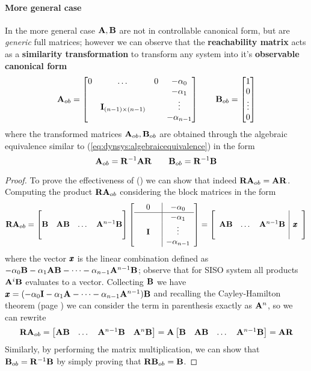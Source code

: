	\paragraph{More general case} In the more general case $\mathbf{A},\mathbf{B}$ are not in controllable canonical form, but are \textit{generic} full matrices; however we can observe that the \textbf{reachability matrix} acts as a \textbf{similarity transformation} to transform any system into it's \textbf{observable canonical form} 
	\[ \mathbf{A}_{ob} = \begin{bmatrix}  0 & \dots & 0 & - \alpha_0  \\ &&& -\alpha_1 \\ &  \mathbf{I}_{(n-1)\times(n-1)} && \vdots \\ &&& -\alpha_{n-1} \end{bmatrix} \qquad \mathbf{B}_{ob} = \begin{bmatrix} 1\\ 0 \\ \vdots \\ 0 \end{bmatrix} \]
	where the transformed matrices $\mathbf{A}_{ob}, \mathbf{B}_{ob}$ are obtained through the algebraic equivalence similar to (\ref{eq:dynsys:algebraicequivalence}) in the form
	\begin{equation} \label{eq:gram:temp3}
		\mathbf{A}_{ob} = \mathbf{R}^{-1} \mathbf{A} \mathbf{R} \qquad \mathbf{B}_{ob} = \mathbf{R}^{-1} \mathbf{B}
	\end{equation}
	\begin{proof}
		To prove the effectiveness of (\theequation) we can show that indeed $\mathbf{R} \mathbf{A}_{ob} = \mathbf{A} \mathbf{R}$. Computing the product $\mathbf{R} \mathbf{A}_{ob}$ considering the block matrices in the form
		\[ \mathbf{R} \mathbf{A}_{ob} = \begin{bmatrix}  \\ \mathbf{B}  & \mathbf{A} \mathbf{B} & \dots & \mathbf{A}^{n-1} \mathbf{B} \\ & \end{bmatrix} \begin{bmatrix} \begin{array}{ccc | c}
			& 0 & &- \alpha_0 \\ \hline
			&&& - \alpha_1 \\ 
			& \mathbf{I} &&\vdots \\ &&&-\alpha_{n-1}
		\end{array} \end{bmatrix} = \begin{bmatrix} \begin{array}{ccc | c}
			&&&\\
			\mathbf{A} \mathbf{B}&  \dots & \mathbf{A}^{n-1} \mathbf{B} & \pmb{x} \\ &&&
		\end{array} \end{bmatrix}\]
		where the vector $\pmb{x}$ is the linear combination defined as $-\alpha_0\mathbf{B} - \alpha_1 \mathbf{A}\mathbf{B} - \dots-\alpha_{n-1} \mathbf{A}^{n-1}\mathbf{B}$; observe that for SISO system all products $\mathbf{A}^i\mathbf{B}$ evaluates to a vector. Collecting $\mathbf{B}$ we have $\pmb{x} = (-\alpha_0 \mathbf{I} - \alpha_1 \mathbf{A}- \dots - \alpha_{n-1} \mathbf{A}^{n-1})\mathbf{B}$ and recalling the Cayley-Hamilton theorem (page \pageref{th:cayley}) we can consider the term in parenthesis exactly as $\mathbf{A}^n$, so we can rewrite
		\[ \mathbf{R} \mathbf{A}_{ob} = \begin{bmatrix} \mathbf{A}\mathbf{B} & \dots & \mathbf{A}^{n-1}\mathbf{B} & \mathbf{A}^n \mathbf{B} \end{bmatrix} = \mathbf{A} \begin{bmatrix} \mathbf{B} & \mathbf{A}\mathbf{B} & \dots & \mathbf{A}^{n-1} \mathbf{B} \end{bmatrix} = \mathbf{A} \mathbf{R} \]
		Similarly, by performing the matrix multiplication, we can show that $\mathbf{B}_{ob} =\mathbf{R}^{-1}\mathbf{B}$ by simply proving that $\mathbf{R} \mathbf{B}_{ob} = \mathbf{B}$.
	\end{proof}
	
